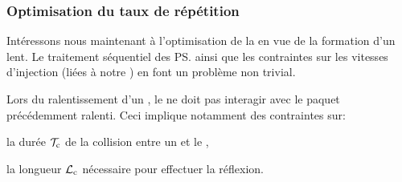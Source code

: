 
\subsubsection{Optimisation du taux de répétition}

Intéressons nous maintenant à l'optimisation de la \techmimo en vue de la formation d'un \jat lent. Le traitement séquentiel des \ps ainsi que les contraintes sur les vitesses d'injection (liées à notre \setup) en font un problème non trivial. 

\noindent Lors du ralentissement d'un \pat, le \mimo ne doit pas interagir avec le paquet précédemment ralenti. Ceci implique notamment des contraintes sur:
\begin{itemizel}
	\item la durée $\mathcal{T}_{\rm c}$ de la collision entre un \pat et le \mimo,%
%
	\item la longueur $\mathcal{L}_{\rm c}$ nécessaire pour effectuer la réflexion.%
%
\end{itemizel}

